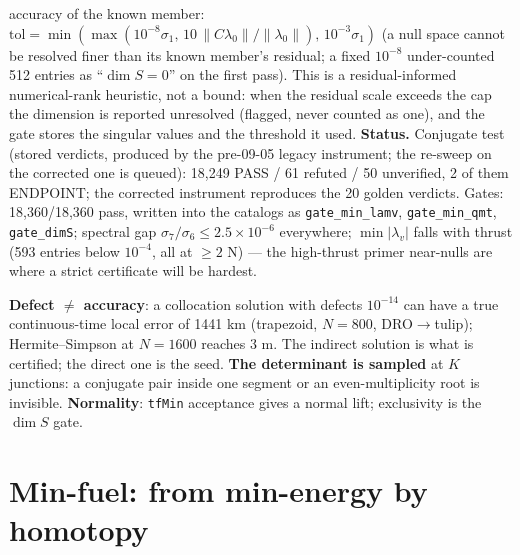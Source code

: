 \documentclass[11pt]{article}
\newcommand{\lv}{\lambda_v}\newcommand{\lr}{\lambda_r}\newcommand{\lm}{\lambda_m}
\newcommand{\file}[1]{\texttt{#1}}
\begin{document}
\begin{rig}
accuracy of the known member: $\mathrm{tol}=\min(\max(10^{-8}\sigma_1,\,10\,\|C\lambda_0\|/\|\lambda_0\|),\,10^{-3}\sigma_1)$
(a null space cannot be resolved finer than its known member's residual; a
fixed $10^{-8}$ under-counted 512 entries as ``$\dim S=0$'' on the first pass). This is a residual-informed numerical-rank heuristic, not a bound: when the residual scale exceeds the cap the dimension is reported unresolved (flagged, never counted as one), and the gate stores the singular values and the threshold it used.
\textbf{Status.} Conjugate test (stored verdicts, produced by the pre-09-05 legacy instrument; the re-sweep on the corrected one is queued): 18,249 PASS / 61 refuted / 50 unverified, 2 of them ENDPOINT; the corrected instrument reproduces the 20 golden verdicts. Gates: 18,360/18,360 pass, written into the catalogs
as \texttt{gate\_min\_lamv}, \texttt{gate\_min\_qmt}, \texttt{gate\_dimS};
spectral gap $\sigma_7/\sigma_6\le2.5\times10^{-6}$ everywhere; $\min|\lv|$
falls with thrust (593 entries below $10^{-4}$, all at $\ge2$ N) --- the
high-thrust primer near-nulls are where a strict certificate will be hardest.
\end{rig}

\begin{warn}
\textbf{Defect $\ne$ accuracy}\label{sec:defect}: a collocation solution with
defects $10^{-14}$ can have a true continuous-time local error of 1441 km
(trapezoid, $N=800$, DRO$\to$tulip); Hermite--Simpson at $N=1600$ reaches
3 m. The indirect solution is what is certified; the direct one is the seed.
\textbf{The determinant is sampled} at $K$ junctions: a conjugate pair inside
one segment or an even-multiplicity root is invisible. \textbf{Normality}:
\file{tfMin} acceptance gives a normal lift; exclusivity is the $\dim S$ gate.
\end{warn}

\section{Min-fuel: from min-energy by homotopy}
\end{document}

